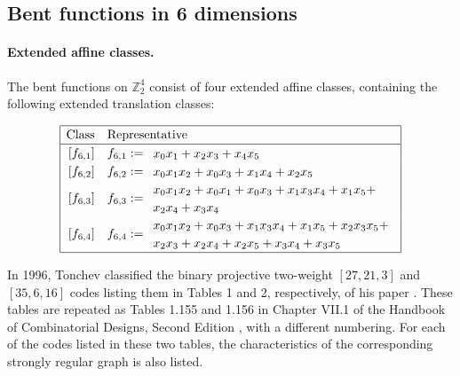 \documentclass[12pt,a4paper]{article}
\newcommand{\mb}[1]{\mathbb{#1}}
\newcommand{\Z}{\mb{Z}}
\begin{document}
\subsection{Bent functions in 6 dimensions}
\paragraph*{Extended affine classes.}

The bent functions on $\Z_2^4$ consist of four
extended affine classes, containing the following extended translation classes:

\begin{align*}
\def\arraystretch{1.2}
\begin{array}{|cl|}
\hline
\text{Class} &
\text{Representative}
\\
\hline
\,[f_{6,1}] & f_{6,1} :=
\begin{array}{l}
x_{0} x_{1} + x_{2} x_{3} + x_{4} x_{5}
\end{array}
\\
\,[f_{6,2}] & f_{6,2} :=
\begin{array}{l}
x_{0} x_{1} x_{2} + x_{0} x_{3} + x_{1} x_{4} + x_{2} x_{5}
\end{array}
\\
\,[f_{6,3}] & f_{6,3} :=
\begin{array}{l}
x_{0} x_{1} x_{2} + x_{0} x_{1} + x_{0} x_{3} + x_{1} x_{3} x_{4} + x_{1} x_{5} +
\\
x_{2} x_{4} + x_{3} x_{4}
\end{array}
\\
\,[f_{6,4}] & f_{6,4} :=
\begin{array}{l}
x_{0} x_{1} x_{2} + x_{0} x_{3} + x_{1} x_{3} x_{4} + x_{1} x_{5} + x_{2} x_{3} x_{5} +
\\
x_{2} x_{3} + x_{2} x_{4} + x_{2} x_{5} + x_{3} x_{4} + x_{3} x_{5}
\end{array}
\\
\hline
\end{array}
\end{align*}

In 1996, Tonchev classified the binary projective two-weight $[27,21,3]$ and $[35,6,16]$ codes
listing them in Tables 1 and 2, respectively, of his paper \cite{Ton96uniformly}.
These tables are repeated as Tables 1.155 and 1.156 in Chapter VII.1 of the Handbook of
Combinatorial Designs, Second Edition \cite{Ton07codes},
with a different numbering.
For each of the codes listed in these two tables, the characteristics of the corresponding
strongly regular graph is also listed.
\end{document}
